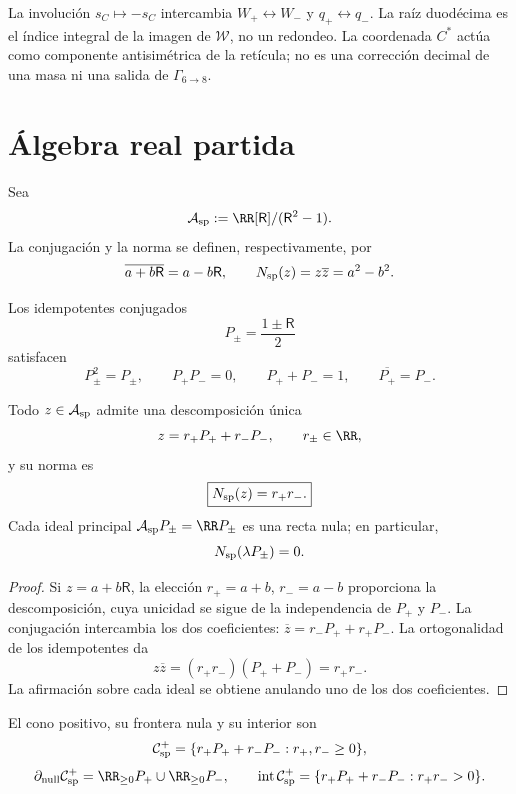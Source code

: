 La involución \(s_C\mapsto-s_C\) intercambia
\(W_+\leftrightarrow W_-\) y \(q_+\leftrightarrow q_-\). La raíz
duodécima es el índice integral de la imagen de \(\mathcal W\), no un
redondeo. La coordenada \(C^*\) actúa como componente antisimétrica de la retícula;
no es una corrección decimal de una masa ni una salida de
\(\Gamma_{6\to8}\).

\section{Álgebra real partida}
\label{sec:algebra-real-partida}

\begin{definition}
Sea
\[
 \mathcal A_{\rm sp}
 :=\RR[\mathsf R]/(\mathsf R^2-1).
\]
La conjugación y la norma se definen, respectivamente, por
\[
 \overline{a+b\mathsf R}=a-b\mathsf R,
 \qquad
 N_{\rm sp}(z)=z\overline z=a^2-b^2.
\]
\end{definition}

Los idempotentes conjugados
\[
 P_\pm=\frac{1\pm\mathsf R}{2}
\]
satisfacen
\[
 P_\pm^2=P_\pm,\qquad
 P_+P_-=0,\qquad
 P_++P_-=1,\qquad
 \overline{P_+}=P_-.
\]

\begin{proposition}
\label{prop:descomposicion-espectral-partida}
Todo \(z\in\mathcal A_{\rm sp}\) admite una descomposición única
\[
 z=r_+P_++r_-P_-,
 \qquad r_\pm\in\RR,
\]
y su norma es
\[
 \boxed{N_{\rm sp}(z)=r_+r_-.}
\]
Cada ideal principal \(\mathcal A_{\rm sp}P_\pm=\RR P_\pm\) es una recta
nula; en particular,
\[
 N_{\rm sp}(\lambda P_\pm)=0.
\]
\end{proposition}

\begin{proof}
Si \(z=a+b\mathsf R\), la elección \(r_+=a+b\), \(r_-=a-b\) proporciona la
descomposición, cuya unicidad se sigue de la independencia de
\(P_+\) y \(P_-\). La conjugación intercambia los dos coeficientes:
\(\overline z=r_-P_++r_+P_-\). La ortogonalidad de los idempotentes da
\[
 z\overline z=(r_+r_-)(P_++P_-)=r_+r_-.
\]
La afirmación sobre cada ideal se obtiene anulando uno de los dos
coeficientes.
\end{proof}

\begin{definition}
\label{def:cono-causal-partido}
El cono positivo, su frontera nula y su interior son
\[
 \mathcal C_{\rm sp}^{+}
 =\{r_+P_++r_-P_-:r_+,r_-\geq0\},
\]
\[
 \partial_{\rm null}\mathcal C_{\rm sp}^{+}
 =\RR_{\geq0}P_+\cup\RR_{\geq0}P_-,
\qquad
 \operatorname{int}\mathcal C_{\rm sp}^{+}
 =\{r_+P_++r_-P_-:r_+r_->0\}.
\]
\end{definition}


